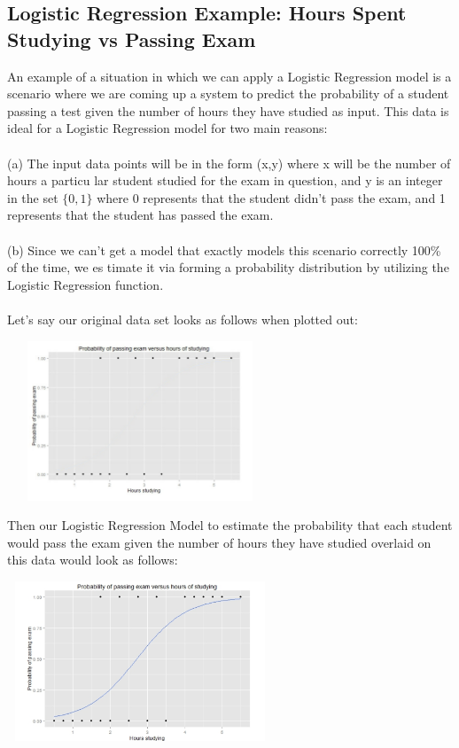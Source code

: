 \documentclass[a4paper]{article}
\begin{document}
\subsection{Logistic Regression Example: Hours Spent Studying vs Passing Exam}
An example of a situation in which we can apply a Logistic Regression model is a scenario where we are coming up a system to predict the probability of a student passing a test given the number of hours they have studied as input. This data is ideal for a Logistic Regression model for two main reasons:\\\\
\indent(a) The input data points will be in the form (x,y) where x will be the number of hours a particu \indent lar student studied for the exam in question, and y is an integer in the set $\{0,1\}$ where 0 represents that \indent the student didn't pass the exam, and 1 represents that the student has passed the exam.\\\\
\indent(b) Since we can't get a model that exactly models this scenario correctly 100\% of the time, we es \indent timate it via forming a probability distribution by utilizing the Logistic Regression function.\\\\
Let's say our original data set looks as follows when plotted out:
\begin{center}
    \includegraphics[width=300px, height=180px]{sample_dataset.png}
\end{center}
Then our Logistic Regression Model to estimate the probability that each student would pass the exam given the number of hours they have studied overlaid on this data would look as follows:
\begin{center}
    \includegraphics[width=300px,height=180px]{overlay.png}
\end{center}
\end{document}

